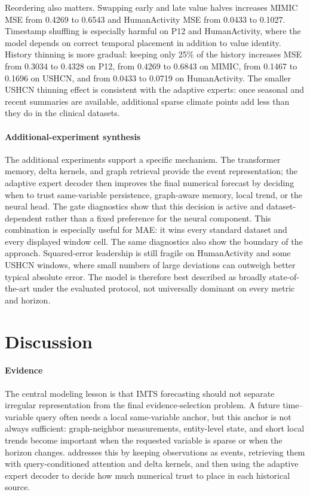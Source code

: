 \documentclass[preprint,12pt]{elsarticle}
\begin{document}
Reordering also matters. Swapping early and late value halves increases MIMIC
MSE from 0.4269 to 0.6543 and HumanActivity MSE from 0.0433 to 0.1027.
Timestamp shuffling is especially harmful on P12 and HumanActivity, where the
model depends on correct temporal placement in addition to value identity.
History thinning is more gradual: keeping only 25\% of the history increases
MSE from 0.3034 to 0.4328 on P12, from 0.4269 to 0.6843 on MIMIC, from 0.1467
to 0.1696 on USHCN, and from 0.0433 to 0.0719 on HumanActivity. The smaller
USHCN thinning effect is consistent with the adaptive experts: once seasonal
and recent summaries are available, additional sparse climate points add less
than they do in the clinical datasets.

\paragraph{Additional-experiment synthesis}
The additional experiments support a specific mechanism. The transformer memory,
delta kernels, and graph retrieval provide the event representation; the
adaptive expert decoder then improves the final numerical forecast by deciding
when to trust same-variable persistence, graph-aware memory, local trend, or
the neural head. The gate diagnostics show that this decision is active and
dataset-dependent rather than a fixed preference for the neural component.
This combination is especially useful for MAE: it wins every standard dataset
and every displayed window cell. The same diagnostics also show the boundary of
the approach. Squared-error leadership is still fragile on HumanActivity and
some USHCN windows, where small numbers of large deviations can outweigh better
typical absolute error. The model is therefore best described as broadly
state-of-the-art under the evaluated protocol, not universally dominant on every
metric and horizon.

\section{Discussion}
\label{sec:discussion}

\paragraph{Evidence}
The central modeling lesson is that IMTS forecasting should not separate
irregular representation from the final evidence-selection problem. A future
time--variable query often needs a local same-variable anchor, but this anchor
is not always sufficient: graph-neighbor measurements, entity-level state, and
short local trends become important when the requested variable is sparse or
when the horizon changes. \method{} addresses this by keeping observations as
events, retrieving them with query-conditioned attention and delta kernels, and
then using the adaptive expert decoder to decide how much numerical trust to
place in each historical source.
\end{document}
